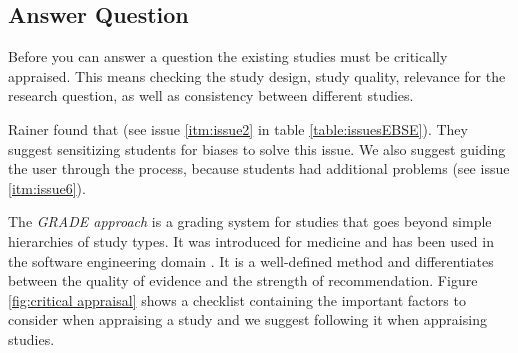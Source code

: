 
\subsection{Answer Question}
\label{subsec:answer question}

Before you can answer a question the existing studies must be critically appraised. This means checking the study design, study quality, relevance for the research question, as well as consistency between different studies. 

Rainer \etal found that  \cite{Rainer2006} (see issue \ref{itm:issue2} in table \ref{table:issuesEBSE}). They suggest sensitizing students for biases to solve this issue. We also suggest guiding the user through the process, because students had additional problems (see issue \ref{itm:issue6}). 

The \emph{GRADE approach} \cite{Atkins2004} is a grading system for studies that goes beyond simple hierarchies of study types. It was introduced for medicine and has been used in the software engineering domain \cite{Wohlin2013EvidenceProfile,Dyba2008}. It is a well-defined method and differentiates between the quality of evidence and the strength of recommendation. Figure \ref{fig:critical appraisal} shows a checklist containing the important factors to consider when appraising a study and we suggest following it when appraising studies. 

